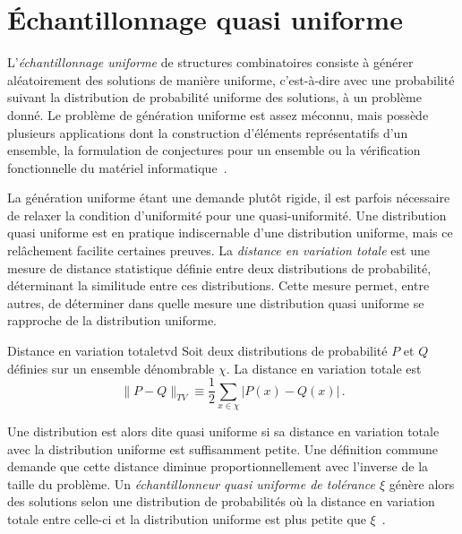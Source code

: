 
\section{Échantillonnage quasi uniforme}
\label{sec:echantillonnage-quasi-uniforme}

L'\textit{échantillonnage uniforme} de structures combinatoires consiste à générer aléatoirement des solutions de manière uniforme, c'est-à-dire avec une probabilité suivant la distribution de probabilité uniforme des solutions, à un problème donné. Le problème de génération uniforme est assez méconnu, mais possède plusieurs applications dont la construction d'éléments représentatifs d'un ensemble, la formulation de conjectures pour un ensemble ou la vérification fonctionnelle du matériel informatique~\cite{jerrumFastUniformGeneration1990, chakrabortyScalableNearlyUniform2013}.

La génération uniforme étant une demande plutôt rigide, il est parfois nécessaire de relaxer la condition d'uniformité pour une quasi-uniformité. Une distribution quasi uniforme est en pratique indiscernable d'une distribution uniforme, mais ce relâchement facilite certaines preuves. La \textit{distance en variation totale} est une mesure de distance statistique définie entre deux distributions de probabilité, déterminant la similitude entre ces distributions. Cette mesure permet, entre autres, de déterminer dans quelle mesure une distribution quasi uniforme se rapproche de la distribution uniforme.

\begin{subdefinition}{Distance en variation totale}{tvd}
    Soit deux distributions de probabilité $P$ et $Q$ définies sur un ensemble dénombrable $\chi$. La distance en variation totale est
    \begin{equation*}
        \lVert P - Q \rVert_{TV} \equiv \frac{1}{2} \sum_{x \in \chi} \lvert P(x) - Q(x) \rvert \,. 
    \end{equation*}
\end{subdefinition}

Une distribution est alors dite quasi uniforme si sa distance en variation totale avec la distribution uniforme est suffisamment petite. Une définition commune demande que cette distance diminue proportionnellement avec l'inverse de la taille du problème. Un \textit{échantillonneur quasi uniforme de tolérance $\xi$} génère alors des solutions selon une distribution de probabilités où la distance en variation totale entre celle-ci et la distribution uniforme est plus petite que $\xi$~\cite{jerrumCountingSamplingIntegrating2003}.

